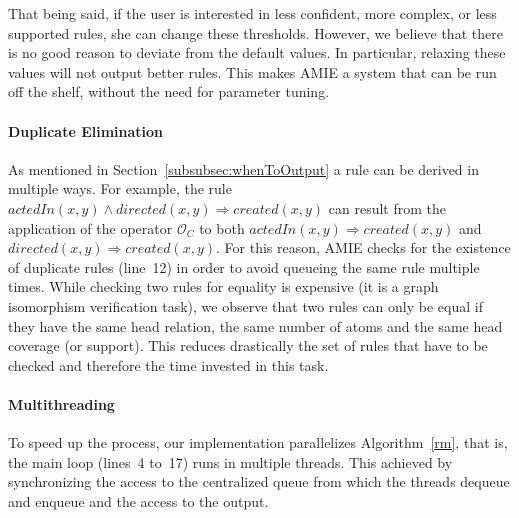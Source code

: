 That being said, if the user is interested in less confident, more complex, or less supported rules, 
she can change these thresholds. However, we believe that there is no good reason to deviate from the default values. 
In particular, relaxing these values will not output better rules. This makes AMIE a system that can be run off the shelf, 
without the need for parameter tuning.

\paragraph{Duplicate Elimination} \label{subsec:duplicateElimination}
As mentioned in Section~\ref{subsubsec:whenToOutput} a rule can be derived in multiple ways.
For example, the rule $actedIn(x,y) \wedge directed(x,y) \Rightarrow created(x,y)$ can result from the application
of the operator $\mathcal{O}_C$ to both $actedIn(x,y) \Rightarrow created(x,y)$ and $directed(x,y) \Rightarrow created(x,y)$.
For this reason, AMIE checks for the existence of duplicate rules (line~12) in order to avoid queueing the same rule multiple times.
While checking two rules for equality is expensive (it is a graph isomorphism verification task), 
we observe that two rules can only be equal if they have the same head relation, the same number of atoms and
the same head coverage (or support). This reduces drastically the set of rules that have to be checked and therefore
the time invested in this task.


\paragraph{Multithreading}
To speed up the process, our implementation parallelizes Algorithm~\ref{rm}, that is, the main loop (lines~4 to~17) runs in multiple threads. 
This achieved by synchronizing the access to the centralized queue from which the threads dequeue and enqueue and the access to the output.

